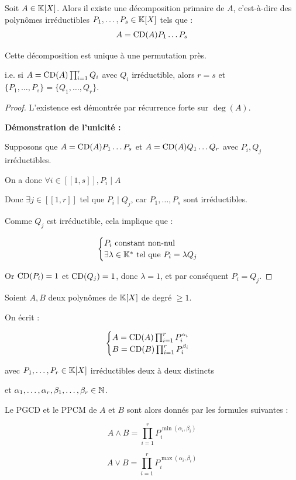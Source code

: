 \documentclass[12pt,a4paper]{report}
\begin{document}
\begin{theorem}
    Soit $A \in \mathbb{K}[X]$. Alors il existe une décomposition primaire de $A$, c'est-à-dire des polynômes irréductibles $P_1, \dots, P_s \in \mathbb{K}[X]$ tels que :
    $$A = \mathrm{CD}(A) P_1 \dots P_s$$

    Cette décomposition est unique à une permutation près.

    i.e. si $A = \mathrm{CD}(A) \prod_{i=1}^r Q_i$ avec $Q_i$ irréductible, alors $r=s$ et $\{P_1,\dots,P_s\} = \{Q_1,\dots,Q_r\}$.
\end{theorem}

\begin{proof}
    L'existence est démontrée par récurrence forte sur $\deg(A)$.

    \textbf{Démonstration de l'unicité :}

    Supposons que $A = \mathrm{CD}(A) P_1 \dots P_s$ et $A = \mathrm{CD}(A) Q_1 \dots Q_r$ avec $P_i, Q_j$ irréductibles.

    On a donc $\forall i \in [\![1,s]\!], P_i \mid A$

    Donc $\exists j \in [\![1,r]\!]$ tel que $P_i \mid Q_j$, car $P_1, \dots, P_s$ sont irréductibles.

    Comme $Q_j$ est irréductible, cela implique que :

    $$\begin{cases}
        P_i \text{ constant non-nul }\\
        \exists \lambda \in \mathbb{K}^* \text{ tel que } P_i = \lambda Q_j
    \end{cases}$$

    Or $\mathrm{CD}(P_i) = 1$ et $\mathrm{CD}(Q_j) = 1$, donc $\lambda = 1$, et par conséquent $P_i = Q_j$.
\end{proof}

\begin{theorem}
    Soient $A,B$ deux polynômes de $\mathbb{K}[X]$ de degré $\ge 1$.

    On écrit :

    $$\begin{cases}
    A = \mathrm{CD}(A) \prod_{i=1}^{r} P_i^{\alpha_i}\\
    B = \mathrm{CD}(B) \prod_{i=1}^{r} P_i^{\beta_i}
    \end{cases}$$

    avec $P_1,\dots,P_r \in \mathbb{K}[X]$ irréductibles deux à deux distincts
    
    et $\alpha_1,\dots,\alpha_r, \beta_1,\dots,\beta_r \in \mathbb{N}$.

    Le PGCD et le PPCM de $A$ et $B$ sont alors donnés par les formules suivantes :

    $$A \wedge B = \prod_{i=1}^{r} P_i^{\min(\alpha_i,\beta_i)}$$
    
    $$A \vee B = \prod_{i=1}^{r} P_i^{\max(\alpha_i,\beta_i)}$$
    
\end{theorem}
\end{document}

